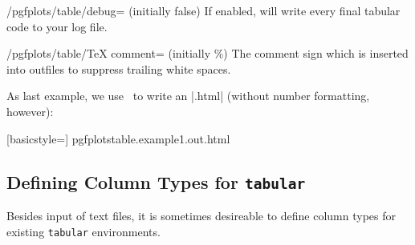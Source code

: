 \begin{key}{/pgfplots/table/debug= (initially false)}
	If enabled, will write every final tabular code to your log file.
\end{key}

\begin{key}{/pgfplots/table/TeX comment= (initially \%)}
	The comment sign which is inserted into outfiles to suppress trailing white spaces.
\end{key}

\noindent As last example, we use \PGFPlotstable\ to write an |.html| (without number formatting, however):
\begin{codeexample}[width=8cm]

	[basicstyle=\ttfamily\footnotesize]
	{pgfplotstable.example1.out.html}
\end{codeexample}

\subsection{Defining Column Types for \texttt{tabular}}
Besides input of text files, it is sometimes desireable to define column types for existing \texttt{tabular} environments.

